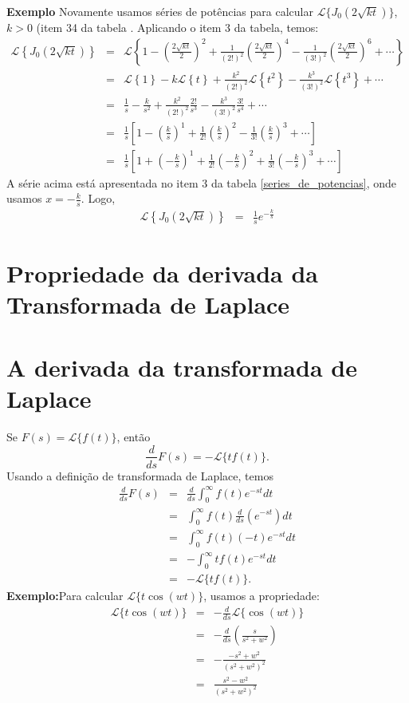 \documentclass[a4paper,10pt]{book}
\begin{document}
{\bf Exemplo} Novamente usamos séries de potências para calcular $\mathcal{L}\{J_0(2\sqrt{kt})\}$, $k>0$ (item 34 da tabela . Aplicando o item 3 da tabela, temos:
\begin{eqnarray*}
\mathcal{L}\left\{J_0(2\sqrt{kt})\right\}&=&\mathcal{L}\left\{1-\left(\frac{2\sqrt{kt}}{2}\right)^2+\frac{1}{(2!)^2}\left(\frac{2\sqrt{kt}}{2}\right)^4-\frac{1}{(3!)^2}\left(\frac{2\sqrt{kt}}{2}\right)^6+\cdots\right\}\\
&=&\mathcal{L}\left\{1\right\}-k\mathcal{L}\left\{t\right\}+\frac{k^2}{(2!)^2}\mathcal{L}\left\{t^2\right\}-\frac{k^3}{(3!)^2}\mathcal{L}\left\{t^3\right\}+\cdots\\
&=&\frac{1}{s}-\frac{k}{s^2}+\frac{k^2}{(2!)^2}\frac{2!}{s^3}-\frac{k^3}{(3!)^2}\frac{3!}{s^4}+\cdots\\
&=&\frac{1}{s}\left[1-\left(\frac{k}{s}\right)^1+\frac{1}{2!}\left(\frac{k}{s}\right)^2-\frac{1}{3!}\left(\frac{k}{s}\right)^3+\cdots\right]\\
&=&\frac{1}{s}\left[1+\left(-\frac{k}{s}\right)^1+\frac{1}{2!}\left(-\frac{k}{s}\right)^2+\frac{1}{3!}\left(-\frac{k}{s}\right)^3+\cdots\right]
\end{eqnarray*}
A série acima está apresentada no item 3 da tabela \ref{series_de_potencias}, onde usamos $x=-\frac{k}{s}$. Logo,
\begin{eqnarray*}
\mathcal{L}\left\{J_0(2\sqrt{kt})\right\}&=&\frac{1}{s}e^{-\frac{k}{s}}
\end{eqnarray*}

\section{Propriedade da derivada da Transformada de Laplace}

\section{A derivada da transformada de Laplace}
% 
 Se $F(s)=\mathcal{L}\{f(t)\}$, então
 \begin{equation}
 \frac{d}{ds}F(s)=-\mathcal{L}\{tf(t)\}.
 \end{equation} 
% 
 Usando a definição de transformada de Laplace, temos
 \begin{eqnarray*}
 \frac{d}{ds}F(s)&=&\frac{d}{ds}\int_0^\infty f(t) e^{-st}dt\\
 &=&\int_0^\infty f(t) \frac{d}{ds}\left(e^{-st}\right)dt\\
 &=&\int_0^\infty f(t) (-t)e^{-st}dt\\
 &=&-\int_0^\infty tf(t) e^{-st}dt\\
 &=&-\mathcal{L}\{tf(t)\}.
 \end{eqnarray*}
% 
% 
 {\bf Exemplo:}Para calcular $\mathcal{L}\{t\cos(wt)\}$, usamos a propriedade:
 \begin{eqnarray*}
 \mathcal{L}\{t\cos(wt)\}&=&-\frac{d}{ds}\mathcal{L}\{\cos(wt)\}\\
 &=&-\frac{d}{ds}\left(\frac{s}{s^2+w^2}\right)\\
 &=&-\frac{-s^2+w^2}{(s^2+w^2)^2}\\
 &=&\frac{s^2-w^2}{(s^2+w^2)^2}\\
 \end{eqnarray*}
 
\end{document}
